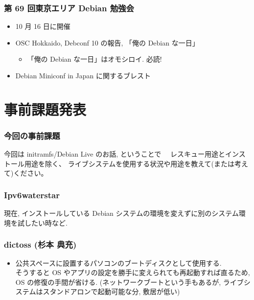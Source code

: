 \documentclass[cjk,dvipdfmx,12pt,%
hyperref={bookmarks=true,bookmarksnumbered=true,bookmarksopen=false,%
colorlinks=false,%
pdftitle={第40回 関西Debian勉強会},%
pdfauthor={倉敷・のがた・佐々木},%
pdfsubject={資料},%
}]{beamer}
\begin{document}
\begin{frame}[fragile]
\frametitle{第 69 回東京エリア Debian 勉強会}

\begin{itemize}
\item 10 月 16 日に開催
\item OSC Hokkaido, Debconf 10 の報告, 「俺の Debian な一日」

\begin{itemize}
\item 「俺の Debian な一日」はオモシロイ. 必読!
\end{itemize}
\item Debian Miniconf in Japan に関するブレスト
\end{itemize}

\end{frame}



\section{事前課題発表}




\begin{frame}[fragile]
\frametitle{今回の事前課題}


\begin{block}{今回は initramfs/Debian Live のお話, ということで}
        　レスキュー用途とインストール用途を除く、
        ライブシステムを使用する状況や用途を教えて(または考えて)ください。
\end{block}


\end{frame}






\begin{frame}[fragile]
\frametitle{ Ipv6waterstar }


現在, インストールしている Debian システムの環境を変えずに別のシステム環境を試したい時など.


\end{frame}



\begin{frame}[fragile]
\frametitle{ dictoss (杉本  典充) }


    \begin{itemize}
          \item 公共スペースに設置するパソコンのブートディスクとして使用する.
        　\\
        そうすると OS やアプリの設定を勝手に変えられても再起動すれば直るため, OS の修復の手間が省ける.
        (ネットワークブートという手もあるが, ライブシステムはスタンドアロンで起動可能な分, 敷居が低い)
\end{itemize}


\end{frame}
\end{document}
